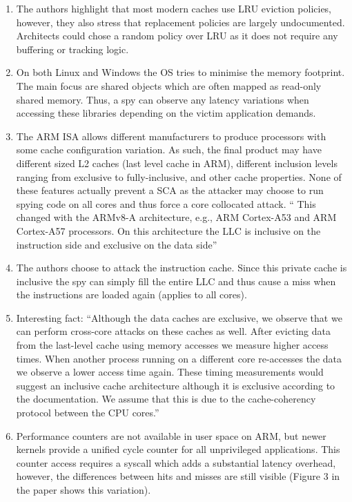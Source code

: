 	\begin{enumerate}
	\item The authors highlight that most modern caches use LRU eviction policies, however, they also stress that replacement policies are largely undocumented. Architects could chose a random policy over LRU as it does not require any buffering or tracking logic. 
	\item On both Linux and Windows the OS tries to minimise the memory footprint. The main focus are shared objects which are often mapped as read-only shared memory. Thus, a spy can observe any latency variations when accessing these libraries depending on the victim application demands.
	\item The ARM ISA allows different manufacturers to produce processors with some cache configuration variation. As such, the final product may have different sized L2 caches (last level cache in ARM), different inclusion levels ranging from exclusive to fully-inclusive, and other cache properties. None of these features actually prevent a SCA as the attacker may choose to run spying code on all cores and thus force a core collocated attack. `` This changed with the ARMv8-A architecture, e.g., ARM Cortex-A53 and ARM Cortex-A57 processors. On this architecture the LLC is inclusive on the instruction side and exclusive on the data side''
	\item The authors choose to attack the instruction cache. Since this private cache is inclusive the spy can simply fill the entire LLC and thus cause a miss when the instructions are loaded again (applies to all cores).
	\item Interesting fact: ``Although the data caches are exclusive, we observe that we can perform cross-core attacks on these caches as well. After evicting data from the last-level cache using memory accesses we measure higher access times. When another process running on a different core re-accesses the data we observe a lower access time again. These timing measurements would suggest an inclusive cache architecture although it is exclusive according to the documentation. We assume that this is due to the cache-coherency protocol between the CPU cores.''
	\item Performance counters are not available in user space on ARM, but newer kernels provide a unified cycle counter for all unprivileged applications. This counter access requires a syscall which adds a substantial latency overhead, however, the differences between hits and misses are still visible (Figure 3 in the paper shows this variation).

\end{enumerate}
